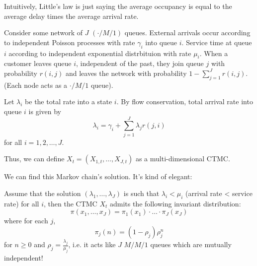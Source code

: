 Intuitively, Little's law is just saying the average occupancy is equal to the average delay times the average arrival rate.

\begin{definition}
    Consider some network of $J$ $(\cdot/M/1)$ queues. External arrivals occur according to independent Poisson processes with rate $\gamma_i$ into queue $i$.
    Service time at queue $i$ according to independent exponential distrbituion with rate $\mu_i$. When a customer leaves queue $i$, independent of the past,
    they join queue $j$ with probability $r(i, j)$ and leaves the network with probability $1 - \sum_{j = 1}^J r(i, j)$. (Each node acts as a $\cdot/M/1$ queue).

    Let $\lambda_i$ be the total rate into a state $i$. By flow conservation, total arrival rate into queue $i$ is given by
    \[ \lambda_i = \gamma_i + \sum_{j = 1}^J \lambda_j r(j, i) \]
    for all $i = 1, 2, \dots, J$.

    Thus, we can define $X_t = (X_{1, t}, \dots, X_{J, t})$ as a multi-dimensional CTMC.
\end{definition}

We can find this Markov chain's solution. It's kind of elegant:

\begin{theorem}
    Assume that the solution $(\lambda_1, \dots, \lambda_J)$ is such that $\lambda_i < \mu_i$ (arrival rate < service rate) for all $i$, then
    the CTMC $X_t$ admits the following invariant distribution:
    \[ \pi(x_1, \dots, x_J) = \pi_1(x_1) \cdot \dots \cdot \pi_J(x_J) \]
    where for each $j$,
    \[ \pi_j(n) = (1 - \rho_j)\rho_j^n \]
    for $n \geq 0$ and $\rho_j = \frac{\lambda_j}{\mu_j}$, i.e. it acts like $J$ $M/M/1$ queues which are mutually independent!
\end{theorem}

